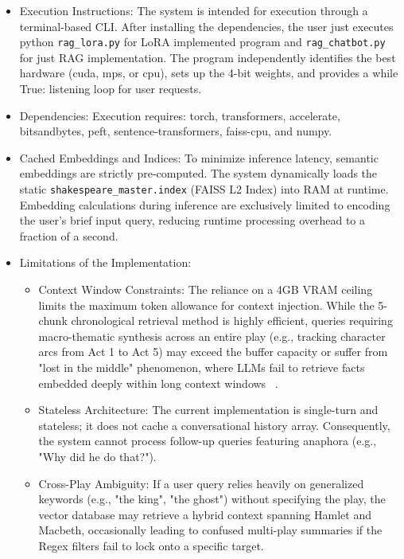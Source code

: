 \documentclass[10pt,conference]{IEEEtran}
\begin{document}
\begin{itemize}
    \item Execution Instructions:
    The system is intended for execution through a terminal-based CLI. After installing the dependencies, the user just executes python \texttt{rag\_lora.py} for LoRA implemented program and \texttt{rag\_chatbot.py} for just RAG implementation. The program independently identifies the best hardware (cuda, mps, or cpu), sets up the 4-bit weights, and provides a while True: listening loop for user requests.
    \item Dependencies:
    Execution requires: torch, transformers, accelerate, bitsandbytes, peft, sentence-transformers, faiss-cpu, and numpy.
    \item Cached Embeddings and Indices:
    To minimize inference latency, semantic embeddings are strictly pre-computed. The system dynamically loads the static \texttt{shakespeare\_master.index} (FAISS L2 Index) into RAM at runtime. Embedding calculations during inference are exclusively limited to encoding the user's brief input query, reducing runtime processing overhead to a fraction of a second.
    \item Limitations of the Implementation:
    \begin{itemize}
        \item Context Window Constraints: The reliance on a 4GB VRAM ceiling limits the maximum token allowance for context injection. While the 5-chunk chronological retrieval method is highly efficient, queries requiring macro-thematic synthesis across an entire play (e.g., tracking character arcs from Act 1 to Act 5) may exceed the buffer capacity or suffer from "lost in the middle" phenomenon, where LLMs fail to retrieve facts embedded deeply within long context windows ~\cite{liu2024lost}.
        \item Stateless Architecture: The current implementation is single-turn and stateless; it does not cache a conversational history array. Consequently, the system cannot process follow-up queries featuring anaphora (e.g., "Why did he do that?").

        \item Cross-Play Ambiguity: If a user query relies heavily on generalized keywords (e.g., "the king", "the ghost") without specifying the play, the vector database may retrieve a hybrid context spanning Hamlet and Macbeth, occasionally leading to confused multi-play summaries if the Regex filters fail to lock onto a specific target.
    \end{itemize}
\end{itemize}
\end{document}
